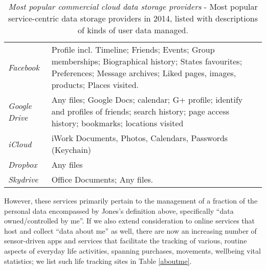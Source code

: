 \documentclass[graybox]{svmult}
\begin{document}
\begin{table}
\begin{tabular}{p{2.2cm} p{9cm}}
\emph{Facebook} & Profile incl. Timeline; Friends; Events; Group memberships; Biographical history; States favourites; Preferences; Message archives; Liked pages, images, products; Places visited. \\

\emph{Google Drive} & Any files; Google Docs; calendar; G+ profile; identify and profiles of friends; search history; page access history; bookmarks; locations visited \\

\emph{iCloud} & iWork Documents, Photos, Calendars, Passwords (Keychain) \\
\emph{Dropbox} & Any files \\

\emph{Skydrive} & Office Documents; Any files. \\

\end{tabular}
\caption{\emph{Most popular commercial cloud data storage providers} - Most popular service-centric data storage providers in 2014, listed with descriptions of kinds of user data managed.}
\label{fig:cloudstorage}
\end{table}

However, these services primarily pertain to the management of a fraction of the personal data encompassed by Jones's definition above, specifically ``data owned/controlled by me''.  If we also extend consideration to online services that host and collect ``data about me'' as well, there are now an increasing number of sensor-driven apps and services that facilitate the tracking of various, routine aspects of everyday life activities, spanning purchases, movements, wellbeing vital statistics; we list such life tracking sites in Table \ref{aboutme}.
\end{document}

